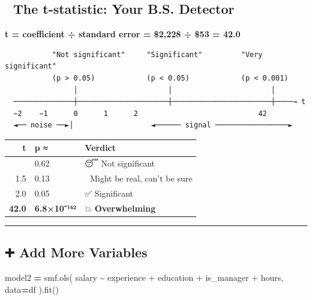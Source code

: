 \documentclass[
]{article}
\newenvironment{Shaded}{\begin{snugshade}}{\end{snugshade}}
\newcommand{\NormalTok}[1]{#1}
\newcommand{\OperatorTok}[1]{\textcolor[rgb]{0.81,0.36,0.00}{\textbf{#1}}}
\newcommand{\StringTok}[1]{\textcolor[rgb]{0.31,0.60,0.02}{#1}}
\begin{document}
\subsection{📐 The t-statistic: Your B.S.
Detector}\label{the-t-statistic-your-b.s.-detector}

\textbf{t = coefficient ÷ standard error = \$2,228 ÷ \$53 = 42.0}

\begin{verbatim}
           "Not significant"     "Significant"         "Very significant"
           (p > 0.05)            (p < 0.05)            (p < 0.001)
                │                     │                       │
  ──────────────┼─────────────────────┼───────────────────────┼────→ t
  −2    −1      0      1      2                            42
  ◄── noise ──►│                  ◄────── signal ─────────────────►
\end{verbatim}

\begin{longtable}[]{@{}rll@{}}
\toprule\noalign{}
t & p ≈ & Verdict \\
\midrule\noalign{}
\endhead
\bottomrule\noalign{}
\endlastfoot
0.5 & 0.62 & 😴 Not significant \\
1.5 & 0.13 & 🤔 Might be real, can't be sure \\
2.0 & 0.05 & ✅ Significant \\
\textbf{42.0} & \textbf{6.8×10⁻¹⁶²} & 💥 \textbf{Overwhelming} \\
\end{longtable}

\begin{center}\rule{0.5\linewidth}{0.5pt}\end{center}

\subsection{➕ Add More Variables}\label{add-more-variables}

\begin{Shaded}
\begin{Highlighting}[]
\NormalTok{model2 }\OperatorTok{=}\NormalTok{ smf.ols(}
    \StringTok{\textquotesingle{}salary \textasciitilde{} experience + education + is\_manager + hours\textquotesingle{}}\NormalTok{,}
\NormalTok{    data}\OperatorTok{=}\NormalTok{df}
\NormalTok{).fit()}
\end{Highlighting}
\end{Shaded}
\end{document}
